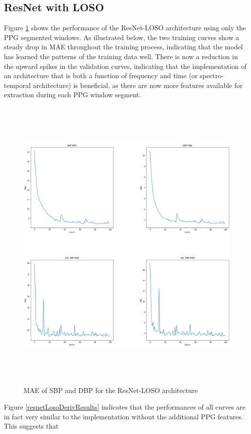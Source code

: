 \subsection{ResNet with LOSO}
Figure \ref{resnetLosoResults} shows the performance of the ResNet-LOSO architecture using only the PPG segmented windows. 
As illustrated below, the two training curves show a steady drop in MAE throughout the training process, indicating 
that the model has learned the patterns of the training data well. There is now a reduction in the upward spikes in the validation 
curves, indicating that the implementation of an architecture that is both a function of frequency and time (or spectro-temporal architecture) is beneficial, 
as there are now more features available for extraction during each PPG window segment.
\begin{figure}[H]
    \centering
    \includegraphics[width=15cm,height=15cm,keepaspectratio]{Results/slapnicar.png}
    \caption{MAE of SBP and DBP for the ResNet-LOSO architecture}
    \label{resnetLosoResults}
\end{figure}\noindent Figure \ref{resnetLosoDerivResults} indicates that the performances of all curves 
are in fact very similar to the implementation without the additional PPG features. This suggests that 
